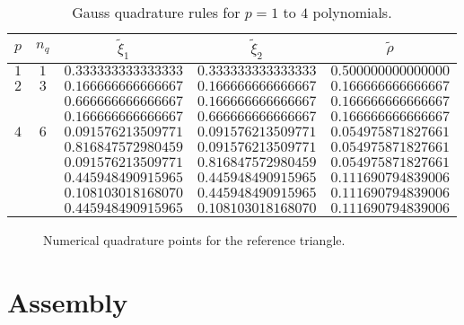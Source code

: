 \begin{table}
  \centering
  \begin{tabular}{ccccc}
    $p$ & $n_q$ & $\tilde \xi_1$ & $\tilde \xi_2$ & $\tilde \rho$ \\
    \hline
    $1$ & $1$ & $0.333333333333333$ & $0.333333333333333$ & $0.500000000000000$ \\
    \hline
    $2$ & $3$ & $0.166666666666667$ & $0.166666666666667$ & $0.166666666666667$ \\ 
    & & $0.666666666666667$ & $0.166666666666667$ & $0.166666666666667$ \\ 
    & & $0.166666666666667$ & $0.666666666666667$ & $0.166666666666667$ \\ 
    \hline
    $4$ & $6$ & $0.091576213509771$ & $0.091576213509771$ & $0.054975871827661$ \\ 
    & & $0.816847572980459$ & $0.091576213509771$ & $0.054975871827661$ \\ 
    & & $0.091576213509771$ & $0.816847572980459$ & $0.054975871827661$ \\ 
    & & $0.445948490915965$ & $0.445948490915965$ & $0.111690794839006$ \\
    & & $0.108103018168070$ & $0.445948490915965$ & $0.111690794839006$ \\ 
    & & $0.445948490915965$ & $0.108103018168070$ & $0.111690794839006$ \\ 
  \end{tabular}
  \caption{Gauss quadrature rules for $p = 1$ to $4$ polynomials.}
  \label{tb:fe_impl_integ_gauss2}
\end{table}

\begin{figure}
  \centering
  \caption{Numerical quadrature points for the reference triangle.}
  \label{fig:fe_impl_integ_gauss2}
\end{figure}

\section{Assembly}
\label{sec:fe_assembly}
